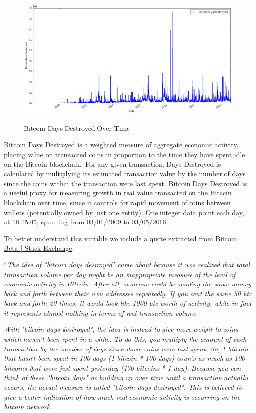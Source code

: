 \begin{figure}[bth]
  \myfloatalign
  {\includegraphics[width=1\linewidth]
    {gfx/bitcoin-days-destroyed-over-time}}
  \caption{Bitcoin Days Destroyed Over Time}
  \label{fig:bitcoin-days-destroyed-over-time}
\end{figure}

Bitcoin Days Destroyed is a weighted measure of aggregate economic
activity, placing value on transacted coins in proportion to the time
they have spent idle on the Bitcoin blockchain. For any given
transaction, Days Destroyed is calculated by multiplying its estimated
transaction value by the number of days since the coins within the
transaction were last spent. Bitcoin Days Destroyed is a useful proxy
for measuring growth in real value transacted on the Bitcoin
blockchain over time, since it controls for rapid movement of coins
between wallets (potentially owned by just one entity). One integer
data point each day, at 18:15:05, spanning from 03/01/2009 to
03/05/2016.

To better understand this variable we include a quote extracted from
\href{http://bitcoin.stackexchange.com/questions/845/what-are-bitcoin-days-destroyed}{Bitcoin
  Beta | Stack Exchange}:

``\textit{The idea of "bitcoin days destroyed" came about because it
  was realized that total transaction volume per day might be an
  inappropriate measure of the level of economic activity in Bitcoin.
  After all, someone could be sending the same money back and forth
  between their own addresses repeatedly. If you sent the same 50 btc
  back and forth 20 times, it would look like 1000 btc worth of
  activity, while in fact it represents almost nothing in terms of
  real transaction volume.}

\textit{With "bitcoin days destroyed", the idea is instead to give
  more weight to coins which haven't been spent in a while. To do
  this, you multiply the amount of each transaction by the number of
  days since those coins were last spent. So, 1 bitcoin that hasn't
  been spent in 100 days (1 bitcoin * 100 days) counts as much as 100
  bitcoins that were just spent yesterday (100 bitcoins * 1 day).
  Because you can think of these "bitcoin days" as building up over
  time until a transaction actually occurs, the actual measure is
  called "bitcoin days destroyed". This is believed to give a better
  indication of how much real economic activity is occurring on the
  bitcoin network.}

